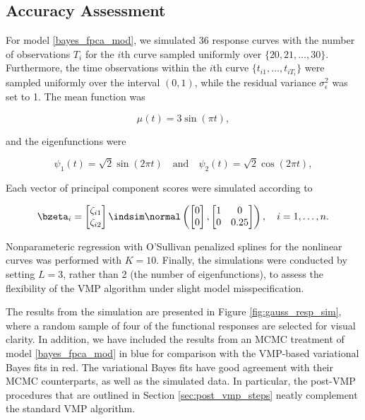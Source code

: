 \documentclass[12pt]{article}
\def\sigsqeps{\sigma^2_{\epsilon}}
\theoremstyle{plain}
\theoremstyle{definition}
\theoremstyle{remark}
\begin{document}

\subsection{Accuracy Assessment}
\label{sec:acc_ass}

For model \eqref{bayes_fpca_mod}, we simulated 36 response curves with the number
of observations $T_i$ for the $i$th curve sampled uniformly over $\{ 20, 21, \dots, 30 \}$. Furthermore, the time
observations within the $i$th curve $\{ t_{i1}, \dots, t_{i T_i} \}$ were sampled uniformly over the interval $(0, 1)$,
while the residual variance $\sigsqeps$ was set to 1. The mean function was

\begin{equation}
	\mu (t) = 3 \sin (\pi t),
\label{mean_func_gauss_sim}
\end{equation}

\noindent and the eigenfunctions were

\begin{equation}
	\psi_1 (t) = \sqrt{2} \sin (2 \pi t) \quad
	\text{and} \quad
	\psi_2 (t) = \sqrt{2} \cos (2 \pi t),
\label{bf_gauss_sim}
\end{equation}

\noindent Each vector of principal component scores were simulated according to

\begin{equation}
	\bzeta_i = \begin{bmatrix}
		\zeta_{i1} \\
		\zeta_{i2}
	\end{bmatrix} \indsim \normal \left(
		\begin{bmatrix}
			0 \\
			0
		\end{bmatrix},
		\begin{bmatrix}
			1 & 0 \\
			0 & 0.25
		\end{bmatrix}
	\right), \quad i = 1, \dots, n.
\label{score_sims}
\end{equation}

\noindent Nonparameteric regression with O'Sullivan penalized splines for the nonlinear curves was performed
with $K = 10$. Finally, the simulations were conducted by setting $L = 3$, rather
than 2 (the number of eigenfunctions), to assess the flexibility of the VMP algorithm under slight model misspecification.

The results from the simulation are presented in Figure \ref{fig:gauss_resp_sim}, where a random sample of
four of the functional responses are selected for visual clarity. In addition, we have included the results from an MCMC
treatment of model \eqref{bayes_fpca_mod} in blue for comparison with
the VMP-based variational Bayes fits in red. The variational Bayes fits have good agreement with their MCMC
counterparts, as well as the simulated data.
In particular, the post-VMP procedures that are outlined in Section \ref{sec:post_vmp_steps} neatly
complement the standard VMP algorithm.
\end{document}
